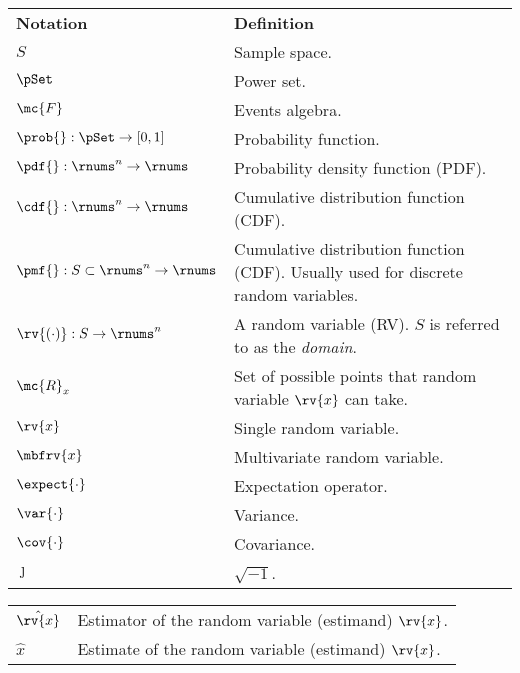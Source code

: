 \begin{table}[h]
    \centering
    \begin{tabular}{p{}p{}}
        \textbf{Notation} & \textbf{Definition}\\[5pt]
        $S$ & Sample space.\\
        $\pSet$ & Power set. \\
        $\mc{F}$ & Events algebra.\\
        $\prob{}:\pSet\to[0,1]$ & Probability function.\\
        $\pdf{}:\rnums^{n}\to\rnums$ & Probability density function (PDF).\\
        $\cdf{}:\rnums^{n}\to\rnums$ & Cumulative distribution function (CDF).\\
        $\pmf{}:S\subset\rnums^{n}\to\rnums$ & Cumulative distribution function (CDF). Usually used for discrete random variables.\\
        $\rv{(\cdot)}: S\to\rnums^{n}$& A random variable (RV). $S$ is referred to as the \emph{domain}. \\
        $\mc{R}_{x}$& Set of possible points that random variable $\rv{x}$ can take. \\
        $\rv{x}$ & Single random variable.\\
        $\mbfrv{x}$ & Multivariate random variable.   \\
        $\expect{\cdot}$ & Expectation operator.\\
        $\var{\cdot}$ & Variance.      \\
        $\cov{\cdot}$ & Covariance.      \\
        $\jmath$ & $\sqrt{-1}$.              
    \end{tabular}
\end{table}

\begin{table}[h]
    \centering
    \begin{tabular}{p{}p{}}
        $\hat{\rv{x}}$ & Estimator of the random variable (estimand) $\rv{x}$.\\        
        $\hat{x}$ & Estimate of the random variable (estimand) $\rv{x}$.
    \end{tabular}
\end{table}

